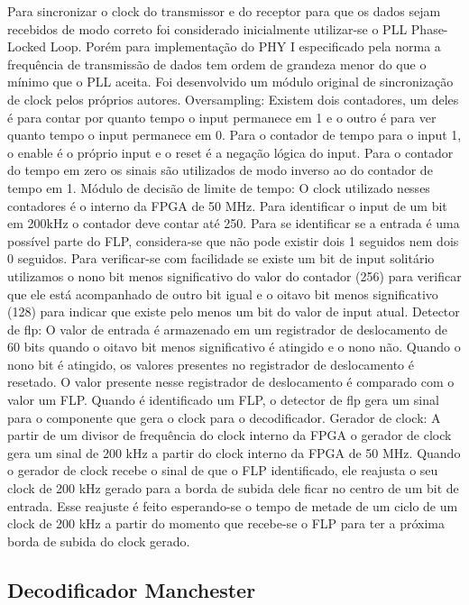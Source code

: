	Para sincronizar o clock do transmissor e do receptor para que os dados sejam recebidos de modo correto foi considerado inicialmente utilizar-se o PLL Phase-Locked Loop. Porém para implementação do PHY I especificado pela norma a frequência de transmissão de dados tem ordem de grandeza menor do que o mínimo que o PLL aceita. 
	Foi desenvolvido um módulo original de sincronização de clock pelos próprios autores.
	Oversampling: Existem dois contadores, um deles é para contar por quanto tempo o input permanece em 1 e o outro é para ver quanto tempo o input permanece em 0. Para o contador de tempo para o input 1, o enable é o próprio input e o reset é a negação lógica do input. Para o contador do tempo em zero os sinais são utilizados de modo inverso ao do contador de tempo em 1.
	Módulo de decisão de limite de tempo: O clock utilizado nesses contadores é o interno da FPGA de 50 MHz. Para identificar o input de um bit em 200kHz o contador deve contar até 250. Para se identificar se a entrada é uma possível parte do FLP, considera-se que não pode existir dois 1 seguidos nem dois  0 seguidos. Para verificar-se com facilidade se existe um bit de input solitário utilizamos o nono bit menos significativo do valor do contador (256) para verificar que ele está acompanhado de outro bit igual e o oitavo bit menos significativo (128) para indicar que existe pelo menos um bit do valor de input atual.
	Detector de flp: O valor de entrada é armazenado em um registrador de deslocamento de 60 bits quando o oitavo bit menos significativo é atingido e o nono não. Quando o nono bit é atingido, os valores presentes no registrador de deslocamento é resetado. O valor presente nesse registrador de deslocamento é comparado com o valor um FLP. Quando é identificado um FLP, o detector de flp gera um sinal para o componente que gera o clock para o decodificador.
	Gerador de clock: A partir de um divisor de frequência do clock interno da FPGA o gerador de clock gera um sinal de 200 kHz a partir do clock interno da FPGA de 50 MHz. Quando o gerador de clock recebe o sinal de que o FLP identificado, ele reajusta o seu clock de 200 kHz gerado para a borda de subida dele ficar no centro de um bit de entrada. Esse reajuste é feito esperando-se o tempo de metade de um ciclo de um clock de 200 kHz a partir do momento que recebe-se o FLP para ter a próxima borda de subida do clock gerado.
	
	\subsection{Decodificador Manchester}
	
